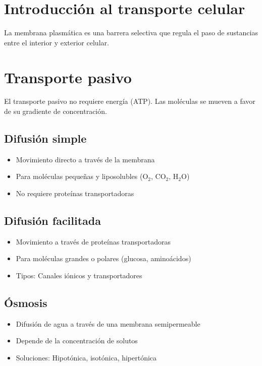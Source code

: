 \section{Introducción al transporte celular}

La membrana plasmática es una barrera selectiva que regula el paso de sustancias entre el interior y exterior celular.

\section{Transporte pasivo}

El transporte pasivo no requiere energía (ATP). Las moléculas se mueven a favor de su gradiente de concentración.

\subsection{Difusión simple}
\begin{itemize}
    \item Movimiento directo a través de la membrana
    \item Para moléculas pequeñas y liposolubles (O$_2$, CO$_2$, H$_2$O)
    \item No requiere proteínas transportadoras
\end{itemize}

\subsection{Difusión facilitada}
\begin{itemize}
    \item Movimiento a través de proteínas transportadoras
    \item Para moléculas grandes o polares (glucosa, aminoácidos)
    \item Tipos: Canales iónicos y transportadores
\end{itemize}

\subsection{Ósmosis}
\begin{itemize}
    \item Difusión de agua a través de una membrana semipermeable
    \item Depende de la concentración de solutos
    \item Soluciones: Hipotónica, isotónica, hipertónica
\end{itemize}

